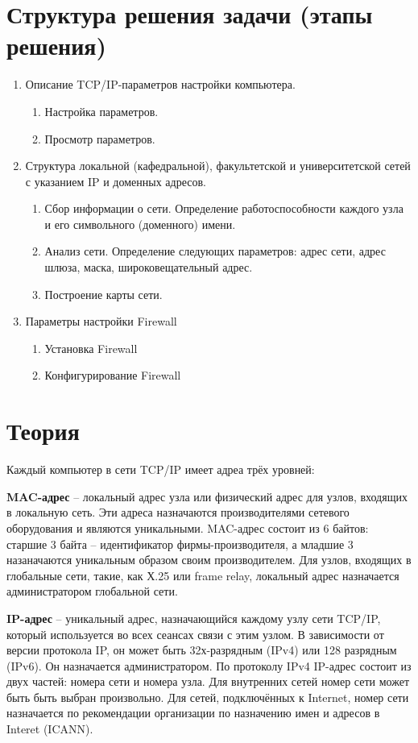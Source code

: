 \documentclass[a4paper]{article}
\begin{document}
\section{Структура решения задачи (этапы решения)}

\begin{enumerate}
	\item Описание TCP/IP-параметров настройки компьютера.
	\begin{enumerate}
		\item Настройка параметров.
		\item Просмотр параметров.
	\end{enumerate}
	\item Структура локальной (кафедральной), факультетской и университетской сетей с указанием IP и доменных адресов.
		\begin{enumerate}
		\item Сбор информации о сети. Определение работоспособности каждого узла и его символьного (доменного) имени.
		\item Анализ сети. Определение следующих параметров: адрес сети, адрес шлюза, маска, широковещательный адрес.
		\item Построение карты сети.
	\end{enumerate}
	\item Параметры настройки Firewall
		\begin{enumerate}
		\item Установка Firewall
		\item Конфигурирование Firewall
	\end{enumerate}
\end{enumerate}

\section{Теория}
Каждый компьютер в сети TCP/IP имеет адреа трёх уровней:

\textbf{MAC-адрес} -- локальный адрес узла или физический адрес для узлов, входящих в локальную сеть. Эти адреса назначаются производителями сетевого оборудования и являются уникальными. MAC-адрес состоит из 6 байтов: старшие 3 байта -- идентификатор фирмы-производителя, а младшие 3 назаначаются уникальным образом своим производителем. Для узлов, входящих в глобальные сети, такие, как Х.25 или frame relay, локальный адрес назначается администратором глобальной сети.

\textbf{IP-адрес} -- уникальный адрес, назначающийся каждому узлу сети TCP/IP, который используется во всех сеансах связи с этим узлом. В зависимости от версии протокола IP, он может быть 32х-разрядным (IPv4) или 128 разрядным (IPv6). Он назначается администратором. По протоколу IPv4 IP-адрес состоит из двух частей: номера сети и номера узла. Для внутренних сетей номер сети может быть быть выбран произвольно. Для сетей, подключённых к Internet, номер сети назначается по рекомендации организации по назначению имен и адресов в Interet (ICANN).
\end{document}
